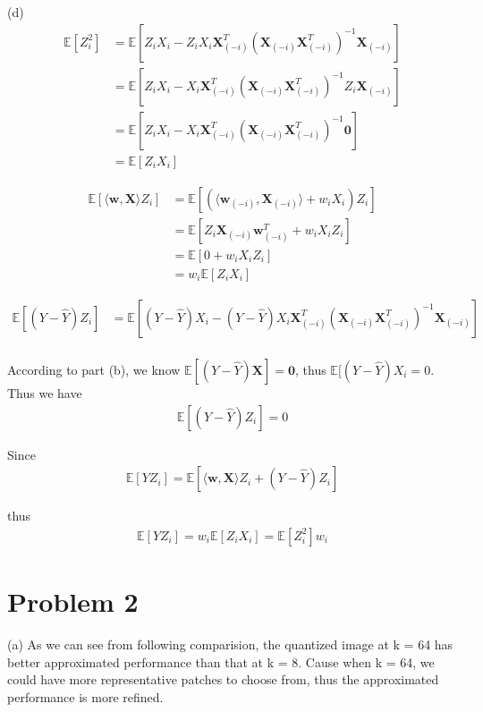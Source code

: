 \documentclass[twoside,11pt]{homework}
\begin{document}
(d) \\
\begin{align*}
\mathbb{E}[Z_i ^2] &= \mathbb{E}[Z_iX_i - Z_i X_i \pmb X_{(-i)}^T (\pmb X_{(-i)} \pmb X_{(-i)}^T)^{-1} \pmb X_{(-i)}] \\
& = \mathbb{E} [Z_iX_i - X_i \pmb X_{(-i)}^T (\pmb X_{(-i)} \pmb X_{(-i)}^T)^{-1} Z_i \pmb X_{(-i)}] \\
& =  \mathbb{E} [Z_iX_i - X_i \pmb X_{(-i)}^T (\pmb X_{(-i)} \pmb X_{(-i)}^T)^{-1} \pmb 0] \\
& = \mathbb{E} [Z_iX_i ]
\end{align*}


\begin{align*}
 \mathbb{E}[\langle \pmb w, \pmb X \rangle  Z_i] &=  \mathbb{E}[(\langle \pmb w_{(-i)}, \pmb X_{(-i)} \rangle  + w_i X_i )Z_i] \\
 & = \mathbb{E}[Z_i \pmb X_{(-i)} \pmb w_{(-i)} ^T+ w_i X_i Z_i] \\
  & = \mathbb{E}[0 + w_i X_i Z_i] \\
 & = w_i  \mathbb{E}[Z_iX_i]
\end{align*}

\begin{align*}
\mathbb{E}[(Y - \hat Y)Z_i] &= \mathbb{E}[(Y - \hat Y)X_i - (Y - \hat Y)X_i \pmb X_{(-i)}^T (\pmb X_{(-i)} \pmb X_{(-i)}^T)^{-1} \pmb X_{(-i)}]\\
\end{align*}

According to part (b), we know $\mathbb{E}[(Y - \hat Y)\pmb X] = \pmb 0 $, thus $\mathbb{E}[(Y - \hat Y)X_i = 0$. Thus we have 
\begin{align*}
\mathbb{E}[(Y - \hat Y)Z_i] = 0
\end{align*}


Since 
\begin{align*}
\mathbb{E} [YZ_i] = \mathbb{E} [\langle \pmb w, \pmb X \rangle Z_i + (Y - \hat Y) Z_i]
\end{align*}


thus 
\begin{align*}
\mathbb{E} [YZ_i]  = w_i  \mathbb{E}[Z_iX_i] = \mathbb{E}[Z_i ^2] w_i
\end{align*}





\section*{Problem 2}
(a)
As we can see from following comparision, the quantized  image at k = 64 has better approximated performance than that at k = 8. Cause when k = 64, we could have more representative patches to choose from, thus the approximated performance is more refined. 
\end{document}
